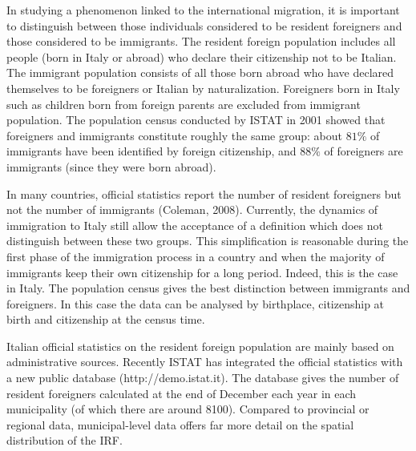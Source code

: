 In studying a phenomenon linked to the international migration, it is important to distinguish between those individuals considered to be resident foreigners and those considered to be immigrants. The resident foreign population includes all people (born in Italy or abroad) who declare their citizenship not to be Italian. The immigrant population consists of all those born abroad who have declared themselves to be foreigners or Italian by naturalization. Foreigners born in Italy such as children born from foreign parents are excluded from immigrant population. The population census conducted by ISTAT in 2001 showed that foreigners and immigrants constitute roughly the same group: about $81\%$ of immigrants have been identified by foreign citizenship, and $88\%$ of foreigners are immigrants (since they were born abroad).

In many countries, official statistics report the number of resident foreigners but not the number of immigrants (Coleman, 2008). Currently, the dynamics of immigration to Italy still allow the acceptance of a definition which does not distinguish between these two groups. This simplification is reasonable during the first phase of the immigration process in a country and when the majority of immigrants keep their own citizenship for a long period. Indeed, this is the case in Italy. The population census gives the best distinction between immigrants and foreigners. In this case the data can be analysed by birthplace, citizenship at birth and citizenship at the census time. 
 
Italian official statistics on the resident foreign population are mainly based on administrative sources. Recently ISTAT has integrated the official statistics with a new public database (http://demo.istat.it). The database gives the number of resident foreigners calculated at the end of December each year in each municipality (of which there are around 8100). Compared to provincial or regional data, municipal-level data offers far more detail on the spatial distribution of the IRF.
 
